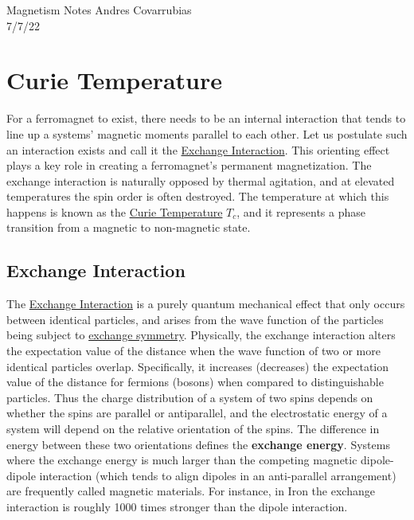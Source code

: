 \documentclass[12pt]{article}
\begin{document}
\noindent Magnetism Notes \hfill Andres Covarrubias    \\
7/7/22 \hfill 

\hrulefill
\section{Curie Temperature} 
For a ferromagnet to exist, there needs to be an internal interaction that tends to line up a systems' magnetic moments parallel to each other. Let us postulate such an interaction exists and call it the \href{https://en.wikipedia.org/wiki/Exchange_interaction}{Exchange Interaction}. This orienting effect plays a key role in creating a ferromagnet's permanent magnetization. The exchange interaction is naturally opposed by thermal agitation, and at elevated temperatures the spin order is often destroyed. The temperature at which this happens is known as the \href{https://en.wikipedia.org/wiki/Curie_temperature}{Curie Temperature} $T_c$, and it represents a phase transition from a magnetic to non-magnetic state. 

\subsection{Exchange Interaction}
The \href{https://en.wikipedia.org/wiki/Exchange_interaction}{Exchange Interaction} is a purely quantum mechanical effect that only occurs between identical particles, and arises from the wave function of the particles being subject to \href{https://en.wikipedia.org/wiki/Identical_particles}{exchange symmetry}. Physically, the exchange interaction alters the expectation value of the distance when the wave function of two or more identical particles overlap. Specifically, it increases (decreases) the expectation value of the distance for fermions (bosons) when compared to distinguishable particles. Thus the charge distribution of a system of two spins depends on whether the spins are parallel or antiparallel, and the electrostatic energy of a system will depend on the relative orientation of the spins. The difference in energy between these two orientations defines the \textbf{exchange energy}. Systems where the exchange energy is much larger than the competing magnetic dipole-dipole interaction (which tends to align dipoles in an anti-parallel arrangement) are frequently called magnetic materials. For instance, in Iron the exchange interaction is roughly 1000 times stronger than the dipole interaction. 
\end{document}
